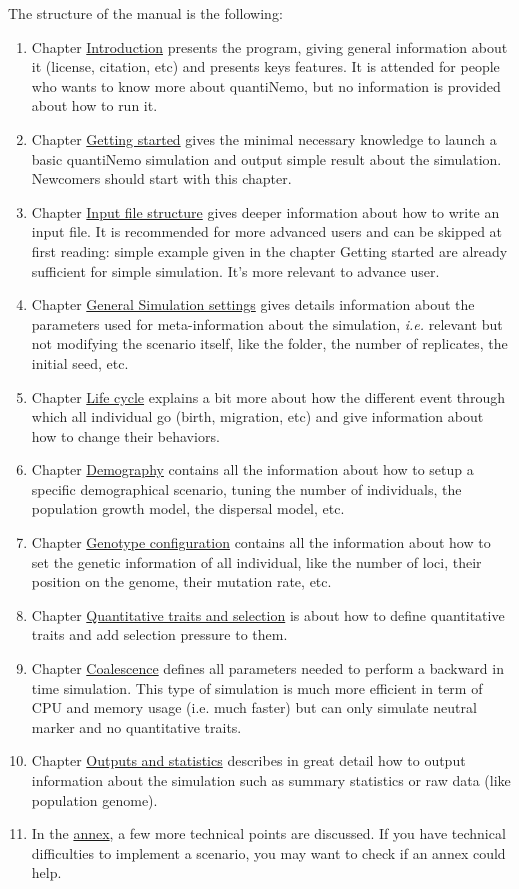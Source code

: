 \documentclass[letterpaper,12pt,oneside]{book}
\begin{document}
The structure of the manual is the following:
\begin{enumerate}
\item Chapter \hyperref[chap:Introduction]{Introduction} presents the program, giving general information about it (license, citation, etc) and presents keys features. It is attended for people who wants to know more about quantiNemo, but no information is provided about how to run it. 
\item Chapter \hyperref[chap:GettingStarted] {Getting started} gives the minimal necessary knowledge to launch a basic quantiNemo simulation and output simple result about the simulation. Newcomers should start with this chapter. 
\item Chapter \hyperref[chap:InputFileStructure]{Input file structure} gives deeper information about how to write an input file. It is recommended for more advanced users and can be skipped at first reading: simple example given in the chapter Getting started are already sufficient for simple simulation. It's more relevant to advance user. 
\item Chapter \hyperref[chap:GeneralSimulationSettings]{General Simulation settings} gives details information about the parameters used for meta-information about the simulation, \textit{i.e.} relevant but not modifying the scenario itself, like the folder, the number of replicates, the initial seed, etc. 
\item Chapter \hyperref[chap:LifeCycle]{Life cycle} explains a bit more about how the different event through which all individual go (birth, migration, etc) and give information about how to change their behaviors. 
\item Chapter \hyperref[chap:Demography]{Demography} contains all the information about how to setup a specific demographical scenario, tuning the number of individuals, the population growth model, the dispersal model, etc. 
\item Chapter \hyperref[chap:GenotypeConfiguration]{Genotype configuration} contains all the information about how to set the genetic information of all individual, like the number of loci, their position on the genome, their mutation rate, etc. 
\item Chapter \hyperref[chap:QuantitativeTraitsAndSelection]{Quantitative traits and selection} is about how to define quantitative traits and add selection pressure to them. 
\item Chapter \hyperref[chap:Coalescence]{Coalescence} defines all parameters needed to perform a backward in time simulation. This type of simulation is much more efficient in term of CPU and memory usage (i.e. much faster) but can only simulate neutral marker and no quantitative traits.
\item Chapter \hyperref[chap:OutputsAndStatistics]{Outputs and statistics} describes in great detail how to output information about the simulation such as summary statistics or raw data (like population genome).  
\item In the \hyperref[chap:TechnicalDetails]{annex}, a few more technical points are discussed. If you have technical difficulties to implement a scenario, you may want to check if  an annex could help. 
\end{enumerate}
\end{document}
